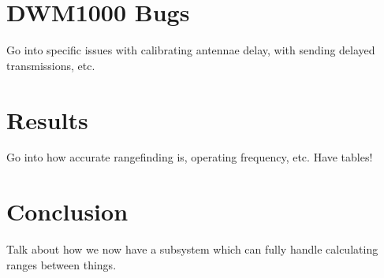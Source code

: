 \section{DWM1000 Bugs}
Go into specific issues with calibrating antennae delay, with sending delayed transmissions, etc.

\section{Results}
Go into how accurate rangefinding is, operating frequency, etc. Have tables!

\section{Conclusion}
Talk about how we now have a subsystem which can fully handle calculating ranges between things.
